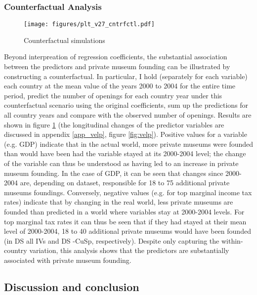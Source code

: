 \documentclass[11pt]{article}
\begin{document}
\subsubsection*{Counterfactual Analysis}

\begin{figure}[htbp]
\centering
\texttt{[image: figures/plt\_v27\_cntrfctl.pdf]}
\caption{\label{fig:cntrfctl}Counterfactual simulations}
\end{figure}

Beyond interpreation of regression coefficients, the substantial association between the predictors and private museum founding can be illustrated by constructing a counterfactual.
In particular, I hold (separately for each variable) each country at the mean value of the years 2000 to 2004 for the entire time period, predict the number of openings for each country year under this counterfactual scenario using the original coefficients, sum up the predictions for all country years and compare with the observed number of openings.
Results are shown in figure \ref{fig:cntrfctl} (the longitudinal changes of the predictor variables are discussed in appendix \ref{app_velp}, figure \ref{fig:velp}).
Positive values for a variable (e.g. GDP) indicate that in the actual world, more private museums were founded than would have been had the variable stayed at its 2000-2004 level; the change of the variable can thus be understood as having led to an increase in private museum founding.
In the case of GDP, it can be seen that changes since 2000-2004 are, depending on dataset, responsible for 18 to 75 additional private museums foundings.
Conversely, negative values (e.g. for top marginal income tax rates) indicate that by changing in the real world, less private museums are founded than predicted in a world where variables stay at 2000-2004 levels.
For top marginal tax rates it can thus be seen that if they had stayed at their mean level of 2000-2004, 18 to 40 additional private museums would have been founded (in DS all IVs and DS -CuSp, respectively).
Despite only capturing the within-country variation, this analysis shows that the predictors are substantially associated with private museum founding. 


\subsection*{Discussion and conclusion}
\end{document}
